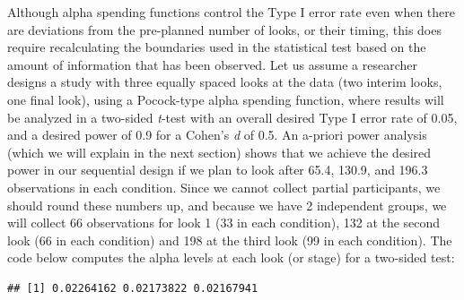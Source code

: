 \documentclass[
  oneside]{krantz}
\makeatletter
\newenvironment{Shaded}{\begin{snugshade}}{\end{snugshade}}
\newcommand{\AttributeTok}[1]{\textcolor[rgb]{0.61,0.61,0.61}{#1}}
\newcommand{\DecValTok}[1]{\textcolor[rgb]{0.06,0.06,0.06}{#1}}
\newcommand{\FloatTok}[1]{\textcolor[rgb]{0.06,0.06,0.06}{#1}}
\newcommand{\FunctionTok}[1]{\textcolor[rgb]{0,0,0}{#1}}
\newcommand{\NormalTok}[1]{#1}
\newcommand{\OtherTok}[1]{\textcolor[rgb]{0.37,0.37,0.37}{#1}}
\newcommand{\SpecialCharTok}[1]{\textcolor[rgb]{0,0,0}{#1}}
\newcommand{\StringTok}[1]{\textcolor[rgb]{0.5,0.5,0.5}{#1}}
\newenvironment{kframe}{%
\medskip{}
\setlength{\fboxsep}{.8em}
 \def\at@end@of@kframe{}%
 \ifinner\ifhmode%
  \def\at@end@of@kframe{\end{minipage}}%
  \begin{minipage}{\columnwidth}%
 \fi\fi%
 \def\FrameCommand##1{\hskip\@totalleftmargin \hskip-\fboxsep
 \colorbox{shadecolor}{##1}\hskip-\fboxsep
     \hskip-\linewidth \hskip-\@totalleftmargin \hskip\columnwidth}%
 \MakeFramed {\advance\hsize-\width
   \@totalleftmargin\z@ \linewidth\hsize
   \@setminipage}}%
 {\par\unskip\endMakeFramed%
 \at@end@of@kframe}
\renewenvironment{Shaded}{\begin{kframe}}{\end{kframe}}
\makeatother
\begin{document}
Although alpha spending functions control the Type I error rate even when there are deviations from the pre-planned number of looks, or their timing, this does require recalculating the boundaries used in the statistical test based on the amount of information that has been observed. Let us assume a researcher designs a study with three equally spaced looks at the data (two interim looks, one final look), using a Pocock-type alpha spending function, where results will be analyzed in a two-sided \emph{t}-test with an overall desired Type I error rate of 0.05, and a desired power of 0.9 for a Cohen's \emph{d} of 0.5. An a-priori power analysis (which we will explain in the next section) shows that we achieve the desired power in our sequential design if we plan to look after 65.4, 130.9, and 196.3 observations in each condition. Since we cannot collect partial participants, we should round these numbers up, and because we have 2 independent groups, we will collect 66 observations for look 1 (33 in each condition), 132 at the second look (66 in each condition) and 198 at the third look (99 in each condition). The code below computes the alpha levels at each look (or stage) for a two-sided test:

\begin{Shaded}
\end{Shaded}

\begin{verbatim}
## [1] 0.02264162 0.02173822 0.02167941
\end{verbatim}
\end{document}
